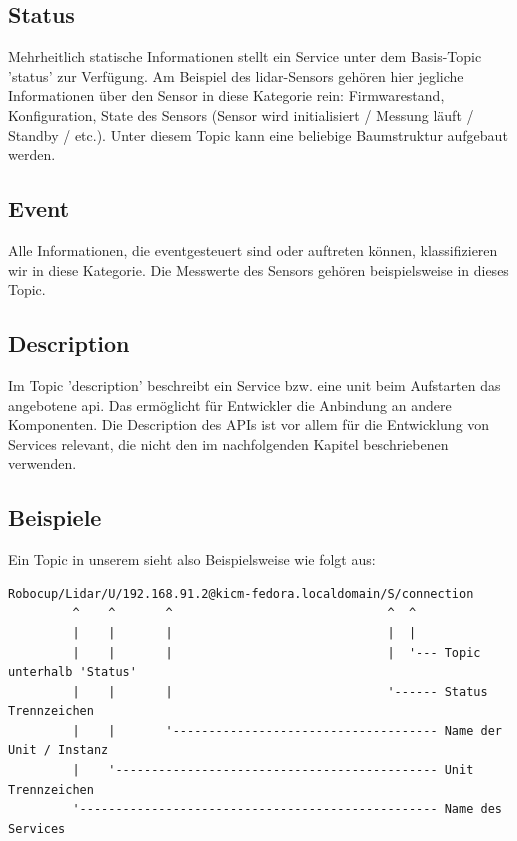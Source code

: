 \subsection{Status}
Mehrheitlich statische Informationen stellt ein Service unter dem Basis-Topic '\gls{status}' zur Verfügung. Am Beispiel des \acrshort{lidar}-Sensors gehören hier jegliche Informationen über den Sensor in diese Kategorie rein: Firmwarestand, Konfiguration, State des Sensors (Sensor wird initialisiert / Messung läuft / Standby / etc.). Unter diesem Topic kann eine beliebige Baumstruktur aufgebaut werden.

\subsection{Event}
Alle Informationen, die eventgesteuert sind oder auftreten können, klassifizieren wir in diese Kategorie. Die Messwerte des Sensors gehören beispielsweise in dieses Topic.

\subsection{Description}
Im Topic '\gls{description}' beschreibt ein Service bzw. eine \acrshort{unit} beim Aufstarten das angebotene \acrshort{api}. Das ermöglicht für Entwickler die Anbindung an andere Komponenten. Die Description des APIs ist vor allem für die Entwicklung von Services relevant, die nicht den im nachfolgenden Kapitel beschriebenen  verwenden.

\subsection{Beispiele}
Ein Topic in unserem sieht also Beispielsweise wie folgt aus:
\begin{verbatim}
Robocup/Lidar/U/192.168.91.2@kicm-fedora.localdomain/S/connection
         ^    ^       ^                              ^  ^
         |    |       |                              |  |
         |    |       |                              |  '--- Topic unterhalb 'Status'
         |    |       |                              '------ Status Trennzeichen
         |    |       '------------------------------------- Name der Unit / Instanz
         |    '--------------------------------------------- Unit Trennzeichen
         '-------------------------------------------------- Name des Services
\end{verbatim}

